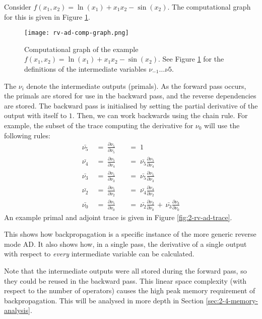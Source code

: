 Consider \(f(x_1, x_2) = \ln(x_1) + x_1x_2 - \sin(x_2)\).
The computational graph for this is given in Figure \ref{fig:2-rv-ad-comp-graph}.
\begin{figure}[h]
    \centering
    \texttt{[image: rv-ad-comp-graph.png]}
    \caption{Computational graph of the example \(f(x_1, x_2) = \ln(x_1) + x_1x_2 - \sin(x_2)\). See Figure \ref{fig:2-rv-ad-comp-graph} for the definitions of the intermediate variables \(\nu_{-1}\ldots\nu{5}\). \cite[Figure~3]{Baydin2015}}
    \label{fig:2-rv-ad-comp-graph}
\end{figure}
The \(\nu_i\) denote the intermediate outputs (primals).
As the forward pass occurs, the primals are stored for use in the backward pass, and the reverse dependencies are stored.
The backward pass is initialised by setting the partial derivative of the output with itself to \(1\).
Then, we can work backwards using the chain rule.
For example, the subset of the trace computing the derivative for \(\nu_0\) will use the following rules:
\begin{align*}
    \bar{\nu_5} \;&=\; \frac{\partial \nu_5}{\partial \nu_5} \;&&=\; 1 \\[0.5em]
    \bar{\nu_4} \;&=\; \frac{\partial \nu_5}{\partial \nu_4} \;&&=\; \bar{\nu_5}\frac{\partial \nu_5}{\partial \nu_4} \\[0.5em]
    \bar{\nu_3} \;&=\; \frac{\partial \nu_5}{\partial \nu_3} \;&&=\; \bar{\nu_5}\frac{\partial \nu_5}{\partial \nu_3} \\[0.5em]
    \bar{\nu_2} \;&=\; \frac{\partial \nu_5}{\partial \nu_2} \;&&=\; \bar{\nu_4}\frac{\partial \nu_4}{\partial \nu_2} \\[0.5em]
    \bar{\nu_0} \;&=\; \frac{\partial \nu_5}{\partial \nu_0} \;&&=\; \bar{\nu_2}\frac{\partial \nu_2}{\partial \nu_0} \,+\, \bar{\nu_3}\frac{\partial \nu_3}{\partial \nu_0}
\end{align*}
An example primal and adjoint trace is given in Figure \ref{fig:2-rv-ad-trace}.

This shows how backpropagation is a specific instance of the more generic reverse mode AD.
It also shows how, in a single pass, the derivative of a single output with respect to \textit{every} intermediate variable can be calculated.

Note that the intermediate outputs were all stored during the forward pass, so they could be reused in the backward pass.
This linear space complexity (with respect to the number of operators) causes the high peak memory requirement of backpropagation.
This will be analysed in more depth in Section \ref{sec:2-4-memory-analysis}.
